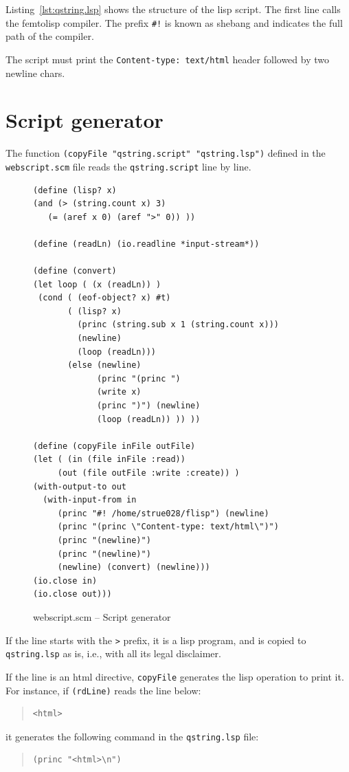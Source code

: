 \documentclass[a4paper,12pt]{book}
\begin{document}
Listing~\ref{lst:qstring.lsp} shows
the structure of the lisp script.
The first line calls the femtolisp
compiler. The prefix \verb|#!|
is known as shebang and indicates
the full path of the compiler.

The script must print the
\verb|Content-type: text/html| header
followed by two newline chars.

\section{Script generator}

The function \verb|(copyFile "qstring.script" "qstring.lsp")|
defined in the \verb|webscript.scm| file reads the
\verb|qstring.script| line by line.


\begin{figure}[!h]
\begin{verbatim}
(define (lisp? x)
(and (> (string.count x) 3)
   (= (aref x 0) (aref ">" 0)) ))

(define (readLn) (io.readline *input-stream*))

(define (convert)
(let loop ( (x (readLn)) )
 (cond ( (eof-object? x) #t)
       ( (lisp? x)
         (princ (string.sub x 1 (string.count x))) 
         (newline)
         (loop (readLn))) 
       (else (newline)
             (princ "(princ ")
             (write x)
             (princ ")") (newline)
             (loop (readLn)) )) ))

(define (copyFile inFile outFile)
(let ( (in (file inFile :read))
     (out (file outFile :write :create)) )
(with-output-to out
  (with-input-from in   
     (princ "#! /home/strue028/flisp") (newline)
     (princ "(princ \"Content-type: text/html\")")
     (princ "(newline)")
     (princ "(newline)")
     (newline) (convert) (newline)))
(io.close in)
(io.close out)))
\end{verbatim}
\caption{webscript.scm -- Script generator}
\label{lst:webscript.scm}
\end{figure}



If the line
starts with the \verb|>| prefix, it is a lisp
program, and is copied to \verb|qstring.lsp| as is,
i.e., with all its legal disclaimer.

If the line is an html directive, \verb|copyFile|
generates the lisp operation to print it. For instance,
if \verb|(rdLine)| reads the line below:
\begin{quote}
\begin{verbatim}
<html>
\end{verbatim}
\end{quote}
it generates the following command in the
\verb|qstring.lsp| file:
\begin{quote}
\begin{verbatim}
(princ "<html>\n")
\end{verbatim}
\end{quote}
\end{document}
